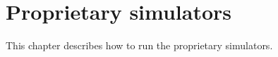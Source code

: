 \chapter{Proprietary simulators}\label{tm:ch:proprietary-simulators}

This chapter describes how to run the proprietary simulators.
